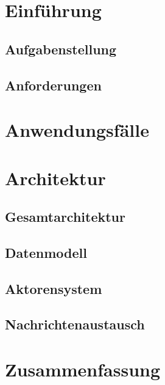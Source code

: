 \section{Einführung}\label{sec:intro} %


    \subsection{Aufgabenstellung}\label{sec:task_definition} %
    

    \subsection{Anforderungen}\label{sec:requirements} %
    

\newpage
\section{Anwendungsfälle}\label{sec:use_cases} %


\newpage
\section{Architektur}\label{sec:architecture} %


    \subsection{Gesamtarchitektur}\label{sec:overall_architecture} %
    

    \subsection{Datenmodell}\label{sec:data_model}
    

    \subsection{Aktorensystem}\label{sec:actor_system} %
    

    \newpage
    \subsection{Nachrichtenaustausch}\label{sec:message_exchange} %
    

\newpage
\section{Zusammenfassung}\label{sec:conclusion} %

